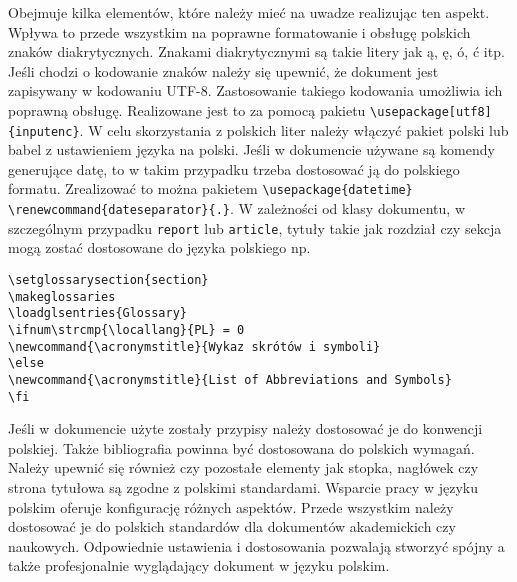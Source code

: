 
Obejmuje kilka elementów, które należy mieć na uwadze realizując ten aspekt. Wpływa to przede wszystkim na poprawne formatowanie i obsługę polskich znaków diakrytycznych. Znakami diakrytycznymi są takie litery jak ą, ę, ó, ć itp. Jeśli chodzi o kodowanie znaków należy się upewnić, że dokument jest zapisywany w kodowaniu UTF-8. Zastosowanie takiego kodowania umożliwia ich poprawną obsługę. Realizowane jest to za pomocą pakietu \texttt{\textbackslash usepackage[utf8]{\{inputenc}\}}. W celu skorzystania z polskich liter należy włączyć pakiet polski lub babel z ustawieniem języka na polski. Jeśli w dokumencie używane są komendy generujące datę, to w takim przypadku trzeba dostosować ją do polskiego formatu. Zrealizować to można pakietem \texttt{\textbackslash usepackage{\{datetime}\}} \texttt{\textbackslash renewcommand{\{dateseparator}\}{\{.}\}}. W zależności od klasy dokumentu, w szczególnym przypadku \texttt{report} lub \texttt{article}, tytuły takie jak rozdział czy sekcja mogą zostać dostosowane do języka polskiego np.
\begin{lstlisting}[caption={Dostosowywanie nazwa do języka polskiego}, label=lst:Dostosowywanie nazw do języka polskiego]
\setglossarysection{section}
\makeglossaries
\loadglsentries{Glossary}
\ifnum\strcmp{\locallang}{PL} = 0 
\newcommand{\acronymstitle}{Wykaz skrótów i symboli}
\else
\newcommand{\acronymstitle}{List of Abbreviations and Symbols}
\fi
\end{lstlisting}
Jeśli w dokumencie użyte zostały przypisy należy dostosować je do konwencji polskiej. Także bibliografia powinna być dostosowana do polskich wymagań. Należy upewnić się również czy pozostałe elementy jak stopka, nagłówek czy strona tytułowa są zgodne z polskimi standardami. Wsparcie pracy w języku polskim oferuje konfigurację różnych aspektów. Przede wszystkim należy dostosować je do polskich standardów dla dokumentów akademickich czy naukowych. Odpowiednie ustawienia i dostosowania pozwalają stworzyć spójny a także profesjonalnie wyglądający dokument w języku polskim.

